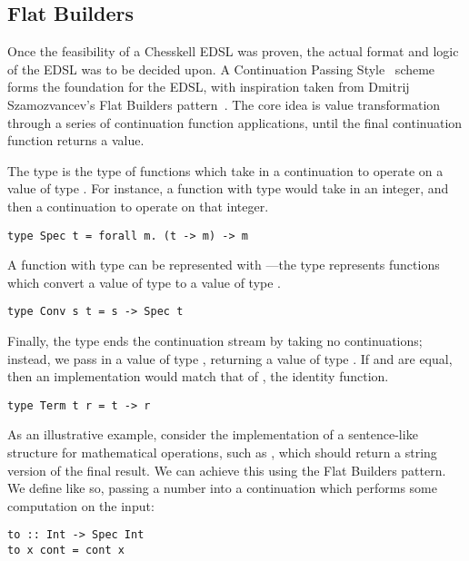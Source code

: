 \subsection{Flat Builders}

Once the feasibility of a Chesskell EDSL was proven, the actual format and logic of the EDSL was to be decided upon. A Continuation Passing Style~\cite{cps} scheme forms the foundation for the EDSL, with inspiration taken from Dmitrij Szamozvancev's Flat Builders pattern~\cite{mezzo}. The core idea is value transformation through a series of continuation function applications, until the final continuation function returns a value.

The type  is the type of functions which take in a continuation to operate on a value of type . For instance, a function with type  would take in an integer, and then a continuation to operate on that integer.

\begin{lstlisting}
type Spec t = forall m. (t -> m) -> m
\end{lstlisting}

A function with type  can be represented with ---the  type represents functions which convert a value of type  to a value of type .

\begin{lstlisting}
type Conv s t = s -> Spec t
\end{lstlisting}

Finally, the  type ends the continuation stream by taking no continuations; instead, we pass in a value of type , returning a value of type . If  and  are equal, then an implementation would match that of , the identity function.

\begin{lstlisting}
type Term t r = t -> r
\end{lstlisting}

As an illustrative example, consider the implementation of a sentence-like structure for mathematical operations, such as , which should return a string version of the final result. We can achieve this using the Flat Builders pattern. We define  like so, passing a number into a continuation which performs some computation on the input:

\begin{lstlisting}
to :: Int -> Spec Int
to x cont = cont x
\end{lstlisting}

